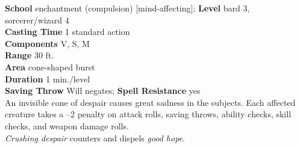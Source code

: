 \textbf{School} enchantment (compulsion) [mind-affecting]; \textbf{Level} bard 3, sorcerer/wizard 4\\
\textbf{Casting Time} 1 standard action\\
\textbf{Components} V, S, M\\
\textbf{Range} 30 ft.\\
\textbf{Area} cone-shaped burst\\
\textbf{Duration} 1 min./level\\
\textbf{Saving Throw }Will negates; \textbf{Spell Resistance} yes\\
An invisible cone of despair causes great sadness in the subjects. Each affected creature takes a –2 penalty on attack rolls, saving throws, ability checks, skill checks, and weapon damage rolls.\\
\textit{Crushing despair} counters and dispels \textit{good hope}.\\
